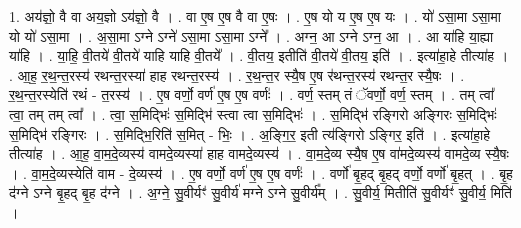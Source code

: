 \documentclass[17pt]{extarticle}
\begin{document}
1. अय॑ज्ञो॒ वै वा अय॒ज्ञो ऽय॑ज्ञो॒ वै । . वा ए॒ष ए॒ष वै वा ए॒षः । . ए॒ष यो य ए॒ष ए॒ष यः । . यो॑ ऽसा॒मा ऽसा॒मा यो यो॑ ऽसा॒मा । . अ॒सा॒मा ऽग्ने ऽग्ने॑ ऽसा॒मा ऽसा॒मा ऽग्ने᳚ । . अग्न॒ आ ऽग्ने ऽग्न॒ आ । . आ या॑हि या॒ह्या या॑हि । . या॒हि॒ वी॒तये॑ वी॒तये॑ याहि याहि वी॒तये᳚ । . वी॒तय॒ इतीति॑ वी॒तये॑ वी॒तय॒ इति॑ । . इत्या॑हा॒हे तीत्या॑ह । . आ॒ह॒ र॒थ॒न्त॒रस्य॑ रथन्त॒रस्या॑ हाह रथन्त॒रस्य॑ । . र॒थ॒न्त॒र स्यै॒ष ए॒ष र॑थन्त॒रस्य॑ रथन्त॒र स्यै॒षः । . र॒थ॒न्त॒रस्येति॑ रथं - त॒रस्य॑ । . ए॒ष वर्णो॒ वर्ण॑ ए॒ष ए॒ष वर्णः॑ । . वर्ण॒ स्तम् तं ॅवर्णो॒ वर्ण॒ स्तम् । . तम् त्वा᳚ त्वा॒ तम् तम् त्वा᳚ । . त्वा॒ स॒मिद्भिः॑ स॒मिद्भि॑ स्त्वा त्वा स॒मिद्भिः॑ । . स॒मिद्भि॑ रङ्गिरो अङ्गिरः स॒मिद्भिः॑ स॒मिद्भि॑ रङ्गिरः । . स॒मिद्भि॒रिति॑ स॒मित् - भिः॒ । . अ॒ङ्गि॒र॒ इती त्य॑ङ्गिरो ऽङ्गिर॒ इति॑ । . इत्या॑हा॒हे तीत्या॑ह । . आ॒ह॒ वा॒म॒दे॒व्यस्य॑ वामदे॒व्यस्या॑ हाह वामदे॒व्यस्य॑ । . वा॒म॒दे॒व्य स्यै॒ष ए॒ष वा॑मदे॒व्यस्य॑ वामदे॒व्य स्यै॒षः । . वा॒म॒दे॒व्यस्येति॑ वाम - दे॒व्यस्य॑ । . ए॒ष वर्णो॒ वर्ण॑ ए॒ष ए॒ष वर्णः॑ । . वर्णो॑ बृ॒हद् बृ॒हद् वर्णो॒ वर्णो॑ बृ॒हत् । . बृ॒ह द॑ग्ने ऽग्ने बृ॒हद् बृ॒ह द॑ग्ने । . अ॒ग्ने॒ सु॒वीर्यꣳ॑ सु॒वीर्य॑ मग्ने ऽग्ने सु॒वीर्य᳚म् । . सु॒वीर्य॒ मितीति॑ सु॒वीर्यꣳ॑ सु॒वीर्य॒ मिति॑ । \newline
\end{document}

